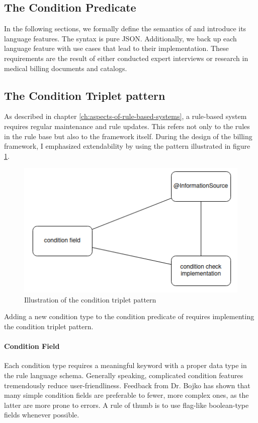 \subsection{The Condition Predicate}\label{subsec:the-condition-predicate}

In the following sections, we formally define the semantics of \RL and introduce its language features.
The syntax is pure JSON.
Additionally, we back up each language feature with use cases that lead to their implementation.
These requirements are the result of either conducted expert interviews or research in medical billing documents and catalogs.

\subsection{The Condition Triplet pattern}\label{subsec:the-condition-triplet-pattern}
As described in chapter \ref{ch:aspects-of-rule-based-systems}, a rule-based system requires regular maintenance and rule updates.
This refers not only to the rules in the rule base but also to the framework itself.
During the design of the billing framework, I emphasized extendability by using the pattern illustrated in figure \ref{fig:condition-triplet-pattern}.
\begin{figure}
    \centering
    \includegraphics[width=0.75\linewidth]{./figures/condition-triplet-pattern}
    \caption{Illustration of the condition triplet pattern}
    \label{fig:condition-triplet-pattern}
\end{figure}
Adding a new condition type to the condition predicate of \RL requires implementing the condition triplet pattern.

\paragraph{Condition Field}
Each condition type requires a meaningful keyword with a proper data type in the rule language schema.
Generally speaking, complicated condition features tremendously reduce user-friendliness.
Feedback from Dr. Bojko has shown that many simple condition fields are preferable to fewer, more complex ones, as the latter are more prone to errors.
A rule of thumb is to use flag-like boolean-type fields whenever possible.

